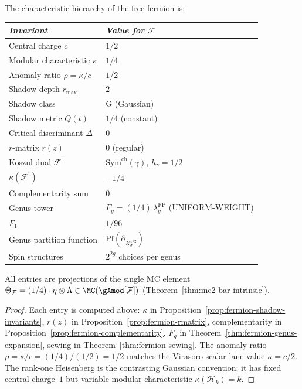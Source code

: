 \begin{proposition}
\label{prop:fermion-characteristic-data}
The characteristic hierarchy of the free fermion is:
\begin{center}
\small
\renewcommand{\arraystretch}{1.2}
\begin{tabular}{ll}
\toprule
\emph{Invariant} & \emph{Value for $\mathcal{F}$} \\
\midrule
Central charge $c$ & $1/2$ \\
Modular characteristic $\kappa$ & $1/4$ \\
Anomaly ratio $\rho = \kappa/c$ & $1/2$ \\
Shadow depth $r_{\max}$ & $2$ \\
Shadow class & G \textup{(Gaussian)} \\
Shadow metric $Q(t)$ & $1/4$ \textup{(constant)} \\
Critical discriminant $\Delta$ & $0$ \\
$r$-matrix $r(z)$ & $0$ \textup{(regular)} \\
Koszul dual $\mathcal{F}^!$ & $\mathrm{Sym}^{\mathrm{ch}}(\gamma)$,
 $h_\gamma = 1/2$ \\
$\kappa(\mathcal{F}^!)$ & $-1/4$ \\
Complementarity sum & $0$ \\
Genus tower & $F_g = (1/4)\,\lambda_g^{\mathrm{FP}}$ \textup{(}UNIFORM-WEIGHT\textup{}) \\
$F_1$ & $1/96$ \\
Genus partition function & $\mathrm{Pf}(\bar\partial_{K^{1/2}_\sigma})$ \\
Spin structures & $2^{2g}$ choices per genus \\
\bottomrule
\end{tabular}
\end{center}
All entries are projections of the single MC element
$\Theta_{\mathcal{F}} = (1/4) \cdot \eta \otimes \Lambda
\in \MC(\gAmod[\mathcal{F}])$
\textup{(}Theorem~\textup{\ref{thm:mc2-bar-intrinsic}}\textup{)}.
\end{proposition}

\begin{proof}
Each entry is computed above:
$\kappa$ in Proposition~\ref{prop:fermion-shadow-invariants},
$r(z)$ in Proposition~\ref{prop:fermion-rmatrix},
complementarity in Proposition~\ref{prop:fermion-complementarity},
$F_g$ in Theorem~\ref{thm:fermion-genus-expansion},
sewing in Theorem~\ref{thm:fermion-sewing}.
The anomaly ratio $\rho = \kappa/c = (1/4)/(1/2) = 1/2$ matches the
Virasoro scalar-lane value $\kappa=c/2$. The rank-one Heisenberg is the
contrasting Gaussian convention: it has fixed central charge~$1$ but
variable modular characteristic $\kappa(\mathcal H_k)=k$.
\end{proof}

